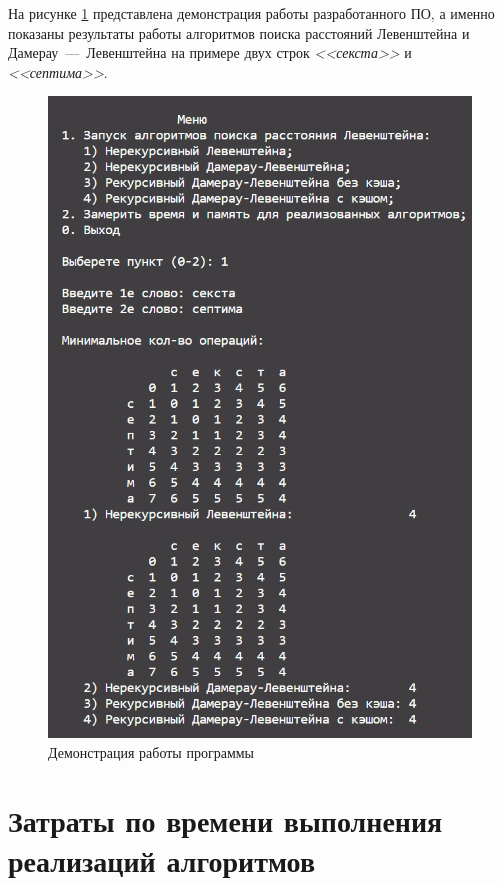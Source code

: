 На рисунке \ref{img:demonstration} представлена демонстрация работы разработанного ПО, а именно показаны результаты работы алгоритмов поиска расстояний Левенштейна и Дамерау~---~Левенштейна на примере двух строк \textit{<<секста>>} и \textit{<<септима>>}.  
\clearpage
\begin{figure}[h]
	\centering
	\includegraphics[height=0.7\textheight]{img/prog_work.png}
	\caption{Демонстрация работы программы}
	\label{img:demonstration}
\end{figure}

\clearpage

\section{Затраты по времени выполнения реализаций алгоритмов}

